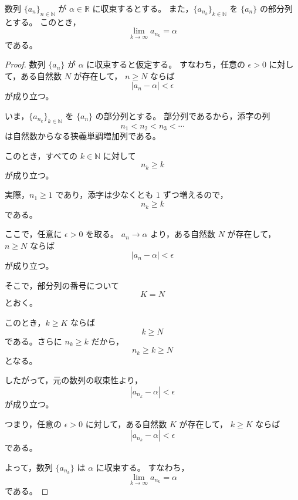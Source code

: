 \begin{theorem}[収束列の部分列]
	数列 $\{a_n\}_{n\in\mathbb{N}}$ が $\alpha\in\mathbb{R}$ に収束するとする。
	また，$\{a_{n_k}\}_{k\in\mathbb{N}}$ を $\{a_n\}$ の部分列とする。
	このとき，
	\[
		\lim_{k\to\infty}a_{n_k}=\alpha
	\]
	である。
\end{theorem}
\begin{proof}
	数列 $\{a_n\}$ が $\alpha$ に収束すると仮定する。
	すなわち，任意の $\epsilon>0$ に対して，ある自然数 $N$ が存在して，
	$n\geq N$ ならば
	\[
		|a_n-\alpha|<\epsilon
	\]
	が成り立つ。

	いま，$\{a_{n_k}\}_{k\in\mathbb{N}}$ を $\{a_n\}$ の部分列とする。
	部分列であるから，添字の列
	\[
		n_1<n_2<n_3<\cdots
	\]
	は自然数からなる狭義単調増加列である。

	このとき，すべての $k\in\mathbb{N}$ に対して
	\[
		n_k\geq k
	\]
	が成り立つ。

	実際，$n_1\geq 1$ であり，添字は少なくとも $1$ ずつ増えるので，
	\[
		n_k\geq k
	\]
	である。

	ここで，任意に $\epsilon>0$ を取る。
	$a_n\to\alpha$ より，ある自然数 $N$ が存在して，
	$n\geq N$ ならば
	\[
		|a_n-\alpha|<\epsilon
	\]
	が成り立つ。

	そこで，部分列の番号について
	\[
		K=N
	\]
	とおく。

	このとき，$k\geq K$ ならば
	\[
		k\geq N
	\]
	である。さらに $n_k\geq k$ だから，
	\[
		n_k\geq k\geq N
	\]
	となる。

	したがって，元の数列の収束性より，
	\[
		|a_{n_k}-\alpha|<\epsilon
	\]
	が成り立つ。

	つまり，任意の $\epsilon>0$ に対して，ある自然数 $K$ が存在して，
	$k\geq K$ ならば
	\[
		|a_{n_k}-\alpha|<\epsilon
	\]
	である。

	よって，数列 $\{a_{n_k}\}$ は $\alpha$ に収束する。
	すなわち，
	\[
		\lim_{k\to\infty}a_{n_k}=\alpha
	\]
	である。
\end{proof}